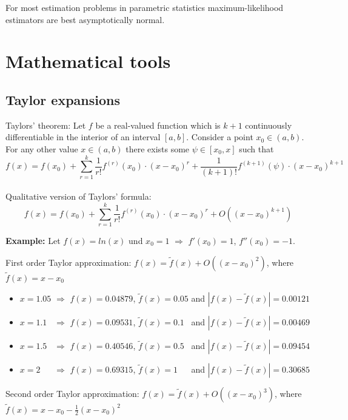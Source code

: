 \documentclass[]{book}
\providecommand{\tightlist}{%
  \setlength{\itemsep}{0pt}\setlength{\parskip}{0pt}}
\theoremstyle{definition}
\theoremstyle{definition}
\theoremstyle{definition}
\theoremstyle{remark}
\begin{document}
For most estimation problems in parametric statistics maximum-likelihood estimators are best asymptotically normal.

\hypertarget{mathematical-tools}{%
\section{Mathematical tools}\label{mathematical-tools}}

\hypertarget{taylor-expansions}{%
\subsection{Taylor expansions}\label{taylor-expansions}}

Taylors' theorem: Let \(f\) be a real-valued function which is
\(k+1\) continuously differentiable in the interior of an interval \([a,b]\). Consider a point
\(x_0\in (a,b)\). For any other value \(x\in (a,b)\) there exists some \(\psi\in [x_0,x]\) such that
\[f(x)=f(x_0)+\sum_{r=1}^k \frac{1}{r!}f^{(r)}(x_0)\cdot(x-x_0)^r+\frac{1}{(k+1)!}f^{(k+1)}(\psi)\cdot(x-x_0)^{k+1}\]\\

Qualitative version of Taylors' formula:
\[f(x)=f(x_0)+\sum_{r=1}^k \frac{1}{r!}f^{(r)}(x_0)\cdot(x-x_0)^r+O((x-x_0)^{k+1})\]

\textbf{Example:} Let \(f(x)=ln(x)\) und \(x_0=1\) \(\Rightarrow\) \(f'(x_0)=1\), \(f''(x_0)=-1\).

First order Taylor approximation: \(f(x)=\tilde f(x)+O((x-x_0)^{2})\), where \(\tilde f(x)=x-x_0\)

\begin{itemize}
\tightlist
\item
  \(x=1.05\) \(\Rightarrow\) \(f(x)=0.04879\), \(\tilde f(x)=0.05\) and \(|f(x)-\tilde f(x)|=0.00121\)
\item
  \(x=1.1\phantom{0}\) \(\Rightarrow\) \(f(x)=0.09531\), \(\tilde f(x)=0.1\phantom{0}\) and \(|f(x)-\tilde f(x)|=0.00469\)
\item
  \(x=1.5\phantom{0}\) \(\Rightarrow\) \(f(x)=0.40546\), \(\tilde f(x)=0.5\phantom{0}\) and \(|f(x)-\tilde f(x)|=0.09454\)
\item
  \(x=2\phantom{.00}\) \(\Rightarrow\) \(f(x)=0.69315\), \(\tilde f(x)=1\phantom{.00}\) and \(|f(x)-\tilde f(x)|=0.30685\)
\end{itemize}

Second order Taylor approximation: \(f(x)=\tilde f(x)+O((x-x_0)^{3})\), where \(\tilde f(x)=x-x_0-\frac{1}{2} (x-x_0)^2\)
\end{document}
